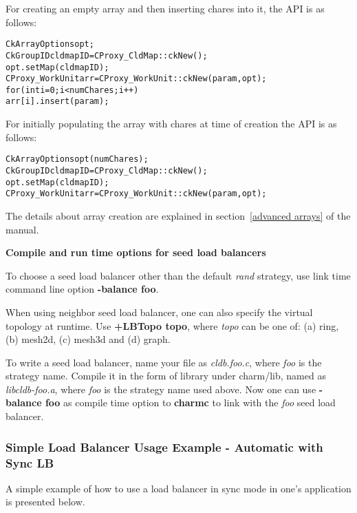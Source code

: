 For creating an empty array and then inserting chares into it, the API is as follows:

\begin{alltt}
  CkArrayOptions opt;
  CkGroupID cldmapID = CProxy_CldMap::ckNew();
  opt.setMap(cldmapID);
  CProxy_WorkUnit arr = CProxy_WorkUnit::ckNew(param, opt); 
  for (int i=0; i<numChares; i++) 
    arr[i].insert(param);
\end{alltt}

For initially populating the array with chares at time of creation the API is as follows:
\begin{alltt}
  CkArrayOptions opt(numChares);
  CkGroupID cldmapID = CProxy_CldMap::ckNew();
  opt.setMap(cldmapID);
  CProxy_WorkUnit arr = CProxy_WorkUnit::ckNew(param, opt); 
\end{alltt}

The details about array creation are explained in section~\ref{advanced arrays} of the manual.

{\bf Compile and run time options for seed load balancers}

To choose a seed load balancer other than the default {\em rand} strategy,
use link time command line option {\bf -balance foo}. 

When using {\rm neighbor} seed load balancer, one can also specify
the virtual topology at runtime. Use {\bf +LBTopo topo}, where {\em topo}
can be one of: (a) ring, (b) mesh2d, (c) mesh3d and (d) graph.

To write a seed load balancer, name your file as {\em cldb.foo.c},
where {\em foo} is the strategy name.  Compile it in the form of library
under charm/lib, named as {\em libcldb-foo.a}, where {\em foo} is the strategy 
name used above. Now one can use {\bf -balance foo} as compile time option
to {\bf charmc} to link with the {\em foo} seed load balancer.

\subsubsection{Simple Load Balancer Usage Example - Automatic with Sync LB}

\label{lbexample}
A simple example of how to use a load balancer in sync mode in one's application is presented below.

